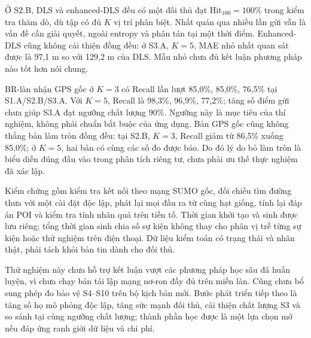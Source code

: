Ở S2.B, DLS và enhanced-DLS đều có một đối thủ đạt Hit$_{100}=100\%$ trong kiểm tra thăm dò, dù tập có đủ $K$ vị trí phân biệt. Nhất quán qua nhiều lần gửi vẫn là vấn đề cần giải quyết, ngoài entropy và phân tán tại một thời điểm. Enhanced-DLS cũng không cải thiện đồng đều: ở S3.A, $K=5$, MAE nhỏ nhất quan sát được là 97,1 m so với 129,2 m của DLS. Mẫu nhỏ chưa đủ kết luận phương pháp nào tốt hơn nói chung.

BR-làn nhận GPS gốc ở $K=3$ có Recall lần lượt 85,0\%, 85,0\%, 76,5\% tại S1.A/S2.B/S3.A. Với $K=5$, Recall là 98,3\%, 96,9\%, 77,2\%; tăng số điểm gửi chưa giúp S3.A đạt ngưỡng chất lượng 90\%. Ngưỡng này là mục tiêu của thí nghiệm, không phải chuẩn bắt buộc của ứng dụng. Bản GPS gốc cũng không thắng bản làm tròn đồng đều: tại S2.B, $K=3$, Recall giảm từ 86,5\% xuống 85,0\%; ở $K=5$, hai bản có cùng các số đo được báo. Do đó lý do bỏ làm tròn là biểu diễn đúng đầu vào trong phân tích riêng tư, chưa phải ưu thế thực nghiệm đã xác lập.

Kiểm chứng gồm kiểm tra kết nối theo mạng SUMO gốc, đối chiếu tìm đường thưa với một cài đặt độc lập, phát lại mọi đầu ra từ cùng hạt giống, tính lại đáp án POI và kiểm tra tính nhân quả trên tiền tố. Thời gian khởi tạo và sinh được lưu riêng; tổng thời gian sinh chia số sự kiện không thay cho phân vị trễ từng sự kiện hoặc thử nghiệm trên điện thoại. Dữ liệu kiểm toán có trạng thái và nhãn thật, phải tách khỏi bản tin dành cho đối thủ.

Thử nghiệm này chưa hỗ trợ kết luận vượt các phương pháp học sâu đã huấn luyện, vì chưa chạy bản tái lập mạng nơ-ron đầy đủ trên miền làn. Cũng chưa bổ sung phép đo bảo vệ S4--S10 trên bộ kịch bản mới. Bước phát triển tiếp theo là tăng số họ mô phỏng độc lập, tăng sức mạnh đối thủ, cải thiện chất lượng S3 và so sánh tại cùng ngưỡng chất lượng; thành phần học được là một lựa chọn mở nếu đáp ứng ranh giới dữ liệu và chi phí.
